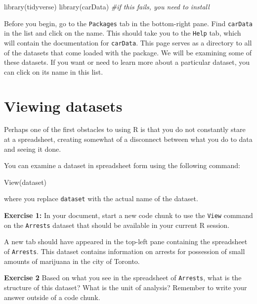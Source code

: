 \documentclass[
]{book}
\makeatletter
\newenvironment{Shaded}{\begin{snugshade}}{\end{snugshade}}
\newcommand{\CommentTok}[1]{\textcolor[rgb]{0.37,0.37,0.37}{\textit{#1}}}
\newcommand{\FunctionTok}[1]{\textcolor[rgb]{0,0,0}{#1}}
\newcommand{\NormalTok}[1]{#1}
\newenvironment{kframe}{%
\medskip{}
\setlength{\fboxsep}{.8em}
 \def\at@end@of@kframe{}%
 \ifinner\ifhmode%
  \def\at@end@of@kframe{\end{minipage}}%
  \begin{minipage}{\columnwidth}%
 \fi\fi%
 \def\FrameCommand##1{\hskip\@totalleftmargin \hskip-\fboxsep
 \colorbox{shadecolor}{##1}\hskip-\fboxsep
     \hskip-\linewidth \hskip-\@totalleftmargin \hskip\columnwidth}%
 \MakeFramed {\advance\hsize-\width
   \@totalleftmargin\z@ \linewidth\hsize
   \@setminipage}}%
 {\par\unskip\endMakeFramed%
 \at@end@of@kframe}
\renewenvironment{Shaded}{\begin{kframe}}{\end{kframe}}
\newenvironment{rmdblock}[1]
  {\begin{shaded*}
  }
  {\end{shaded*}
  }
\newenvironment{learncheck}
  {\begin{rmdblock}{warning}}
  {\end{rmdblock}}
\makeatother
\begin{document}
\begin{Shaded}
\begin{Highlighting}[]
\FunctionTok{library}\NormalTok{(tidyverse)}
\FunctionTok{library}\NormalTok{(carData)  }\CommentTok{\#if this fails, you need to install}
\end{Highlighting}
\end{Shaded}

Before you begin, go to the \texttt{Packages} tab in the bottom-right pane. Find \texttt{carData} in the list and click on the name. This should take you to the \texttt{Help} tab, which will contain the documentation for \texttt{carData}. This page serves as a directory to all of the datasets that come loaded with the package. We will be examining some of these datasets. If you want or need to learn more about a particular dataset, you can click on its name in this list.

\hypertarget{viewing-datasets}{%
\section{Viewing datasets}\label{viewing-datasets}}

Perhaps one of the first obstacles to using R is that you do not constantly stare at a spreadsheet, creating somewhat of a disconnect between what you do to data and seeing it done.

You can examine a dataset in spreadsheet form using the following command:

\begin{Shaded}
\begin{Highlighting}[]
\FunctionTok{View}\NormalTok{(dataset)}
\end{Highlighting}
\end{Shaded}

where you replace \texttt{dataset} with the actual name of the dataset.

\begin{learncheck}
\textbf{Exercise 1:} In your document, start a new code chunk to use the
\texttt{View} command on the \texttt{Arrests} dataset that should be
available in your current R session.
\end{learncheck}

A new tab should have appeared in the top-left pane containing the spreadsheet of \texttt{Arrests}. This dataset contains information on arrests for possession of small amounts of marijuana in the city of Toronto.

\begin{learncheck}
\textbf{Exercise 2} Based on what you see in the spreadsheet of
\texttt{Arrests}, what is the structure of this dataset? What is the
unit of analysis? Remember to write your answer outside of a code chunk.
\end{learncheck}
\end{document}
